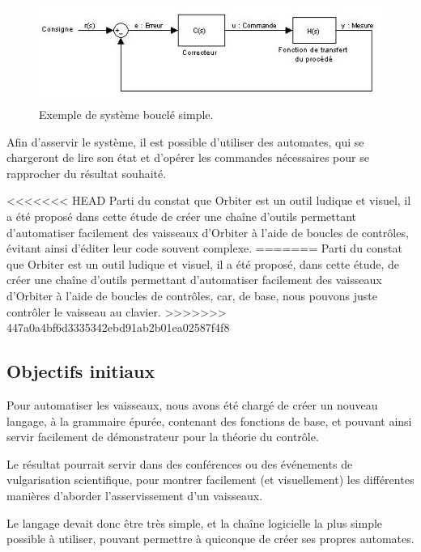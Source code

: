 \documentclass[a4paper,11pt]{article}
\begin{document}
        \begin{figure}[!h]
            \begin{center}
                \includegraphics[width=1\textwidth]{img/boucle_controle.jpg}
                \caption{Exemple de système bouclé simple.}
            \end{center}
        \end{figure}
        
        Afin d'asservir le système, il est possible d'utiliser des automates, qui se chargeront de lire son état et d'opérer les commandes nécessaires pour se rapprocher du résultat souhaité.

<<<<<<< HEAD
        Parti du constat que Orbiter est un outil ludique et visuel, il a été proposé dans cette étude de créer une chaîne d'outils permettant d'automatiser facilement des vaisseaux d'Orbiter à l'aide de boucles de contrôles, évitant ainsi d'éditer leur code souvent complexe.
=======
        Parti du constat que Orbiter est un outil ludique et visuel, il a été proposé, dans cette étude, de créer une chaîne d'outils permettant d'automatiser facilement des vaisseaux d'Orbiter à l'aide de boucles de contrôles, car, de base, nous pouvons juste contrôler le vaisseau au clavier.
>>>>>>> 447a0a4bf6d3335342ebd91ab2b01ea02587f4f8

    \subsection{Objectifs initiaux}
        Pour automatiser les vaisseaux, nous avons été chargé de créer un nouveau langage, à la grammaire épurée, contenant des fonctions de base, et pouvant ainsi servir facilement de démonstrateur pour la théorie du contrôle.

        Le résultat pourrait servir dans des conférences ou des événements de vulgarisation scientifique, pour montrer facilement (et visuellement) les différentes manières d'aborder l'asservissement d'un vaisseaux.

        Le langage devait donc être très simple, et la chaîne logicielle la plus simple possible à utiliser, pouvant permettre à quiconque de créer ses propres automates.
\end{document}
